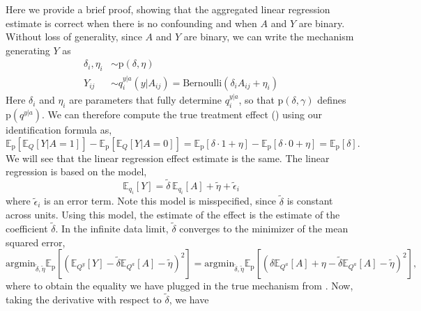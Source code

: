 \documentclass[12pt]{article}
\newcommand{\pr}{\mathrm{p}}
\begin{document}
\iffalse
Here we provide a brief proof, showing that the aggregated linear regression estimate is correct when there is no confounding and when $A$ and $Y$ are binary. Without loss of generality, since $A$ and $Y$ are binary, we can write the mechanism generating $Y$ as
\begin{equation} \label{eqn:no_confound_binary_mechanism}
\begin{split}
	\delta_i, \eta_i &\sim \pr(\delta, \eta)\\
	Y_{ij} &\sim q_i^{y|a}(y | A_{ij}) = \mathrm{Bernoulli}(\delta_i A_{ij} + \eta_i)
\end{split}
\end{equation}
Here $\delta_i$ and $\eta_i$ are parameters that fully determine $q^{y|a}_i$, so that $\pr(\delta, \gamma)$ defines $\pr(q^{y|a})$.
We can therefore compute the true treatment effect () using our identification formula  as, 
\begin{equation}
	\mathbb{E}_{\pr}[\mathbb{E}_{Q}[Y|A=1]] - \mathbb{E}_{\pr}[\mathbb{E}_{Q}[Y|A=0]]=\mathbb{E}_{\pr}[\delta \cdot 1 + \eta] - \mathbb{E}_{\pr}[\delta \cdot 0 + \eta] = \mathbb{E}_{\pr}[\delta].
\end{equation}
We will see that the linear regression effect estimate is the same. The linear regression is based on the model,
\begin{equation}
	\mathbb{E}_{q_i}[Y] = \tilde \delta\, \mathbb{E}_{q_i}[A] + \tilde \eta + \tilde{\epsilon}_i
\end{equation}
where $\tilde \epsilon_i$ is an error term.
Note this model is misspecified, since $\tilde \delta$ is constant across units.
Using this model, the estimate of the effect is the estimate of the coefficient $\tilde \delta$.
In the infinite data limit, $\tilde \delta$ converges to the minimizer of the mean squared error,
\begin{equation}
	\mathrm{argmin}_{\tilde \delta, \tilde \eta} \mathbb{E}_{\pr}[(\mathbb{E}_{Q^y}[Y] - \tilde \delta \mathbb{E}_{Q^a}[A] - \tilde \eta)^2] = \mathrm{argmin}_{\tilde \delta, \tilde \eta} \mathbb{E}_{\pr}[(\delta \mathbb{E}_{Q^a}[A] + \eta - \tilde \delta \mathbb{E}_{Q^a}[A] - \tilde \eta)^2],
\end{equation}
where to obtain the equality we have plugged in the true mechanism from .
Now, taking the derivative with respect to $\tilde \delta$, we have
\end{document}
